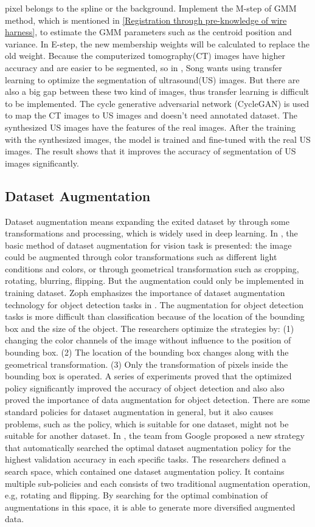     pixel belongs to the spline or the background. Implement the M-step of GMM method, which is mentioned in \ref{Registration through pre-knowledge of wire harness}, to estimate the 
    GMM parameters such as the centroid position and variance. In E-step, the new membership weights will be calculated to replace the old weight. Because the computerized tomography(CT) 
    images have higher accuracy and are easier to be segmented, so in \cite{SONG2022106706}, Song wants using transfer learning to optimize the segmentation of ultrasound(US) images. But 
    there are also a big gap between these two kind of images, thus transfer learning is difficult to be implemented. The cycle generative adversarial network (CycleGAN) is used to map the 
    CT images to US images and doesn't need annotated dataset. The synthesized US images have the features of the real images. After the training with the synthesized images, the model is 
    trained and fine-tuned with the real US images. The result shows that it improves the accuracy of segmentation of US images significantly. 
\subsection{Dataset Augmentation}
    Dataset augmentation means expanding the exited dataset by through some transformations and processing, which is widely used in deep learning.
    In \cite{nesteruk2024image}, the basic method of dataset augmentation for vision task is presented: the image could be augmented through color transformations such as different 
    light conditions and colors, or through geometrical transformation such as cropping, rotating, blurring, flipping. But the augmentation could only be implemented in training dataset. 
    Zoph emphasizes the importance of dataset augmentation technology for object detection tasks in \cite{zoph2020learning}. The augmentation for object detection tasks is more difficult 
    than classification because of the location of the bounding box and the size of the object. The researchers optimize the strategies by: (1) changing the color channels of the image 
    without influence to the position of bounding box. (2) The location of the bounding box changes along with the geometrical transformation. (3) Only the transformation of pixels inside
    the bounding box is operated. A series of experiments proved that the optimized policy significantly improved the accuracy of object detection and also also proved the importance of data 
    augmentation for object detection. There are some standard policies for dataset augmentation in general, but it also causes problems, such as the policy, which is suitable for one dataset,
    might not be suitable for another dataset. In \cite{47890}, the team from Google proposed a new strategy that automatically searched the optimal dataset augmentation policy for 
    the highest validation accuracy in each specific tasks. The researchers defined a search space, which contained one dataset augmentation policy. It contains multiple sub-policies and each 
    consists of two traditional augmentation operation, e.g, rotating and flipping. By searching for the optimal combination of augmentations in this space, it is able to generate more  diversified 
    augmented data.
